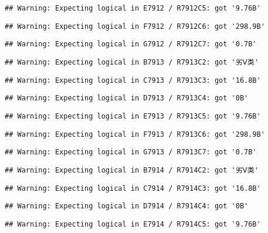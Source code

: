 \documentclass[
]{article}
\begin{document}
\begin{verbatim}
## Warning: Expecting logical in E7912 / R7912C5: got '9.76B'
\end{verbatim}

\begin{verbatim}
## Warning: Expecting logical in F7912 / R7912C6: got '298.9B'
\end{verbatim}

\begin{verbatim}
## Warning: Expecting logical in G7912 / R7912C7: got '0.7B'
\end{verbatim}

\begin{verbatim}
## Warning: Expecting logical in B7913 / R7913C2: got '劣Ⅴ类'
\end{verbatim}

\begin{verbatim}
## Warning: Expecting logical in C7913 / R7913C3: got '16.8B'
\end{verbatim}

\begin{verbatim}
## Warning: Expecting logical in D7913 / R7913C4: got '0B'
\end{verbatim}

\begin{verbatim}
## Warning: Expecting logical in E7913 / R7913C5: got '9.76B'
\end{verbatim}

\begin{verbatim}
## Warning: Expecting logical in F7913 / R7913C6: got '298.9B'
\end{verbatim}

\begin{verbatim}
## Warning: Expecting logical in G7913 / R7913C7: got '0.7B'
\end{verbatim}

\begin{verbatim}
## Warning: Expecting logical in B7914 / R7914C2: got '劣Ⅴ类'
\end{verbatim}

\begin{verbatim}
## Warning: Expecting logical in C7914 / R7914C3: got '16.8B'
\end{verbatim}

\begin{verbatim}
## Warning: Expecting logical in D7914 / R7914C4: got '0B'
\end{verbatim}

\begin{verbatim}
## Warning: Expecting logical in E7914 / R7914C5: got '9.76B'
\end{verbatim}
\end{document}
